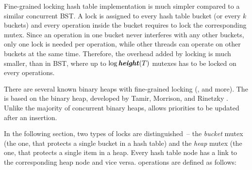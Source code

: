 Fine-grained locking hash table implementation is much simpler compared to a similar concurrent BST. A lock is assigned to every hash table bucket (or every $k$ buckets) and every operation inside the bucket requires to lock the corresponding mutex. Since an operation in one bucket never interferes with any other buckets, only one lock is needed per operation, while other threads can operate on other buckets at the same time. Therefore, the overhead added by locking is much smaller, than in BST, where up to $\log{\ensuremath{\textbf{\textit{height}}(T)}}$ mutexes has to be locked on every operations.

There are several known binary heaps with fine-grained locking (\cite{concurrent_heap1}, \cite{champ} and more). The \cndcname is based on the  binary heap, developed by Tamir, Morrison, and Rinetzky \cite{champ}. Unlike the majority of concurrent binary heaps,  allows priorities to be updated after an insertion.

In the following section, two types of locks are distinguished~-- the \emph{bucket} mutex (the one, that protects a single bucket in a hash table) and the \emph{heap} mutex (the one, that protects a single item in a heap. Every hash table node has a link to the corresponding heap node and vice versa. \cndcname operations are defined as follows:


